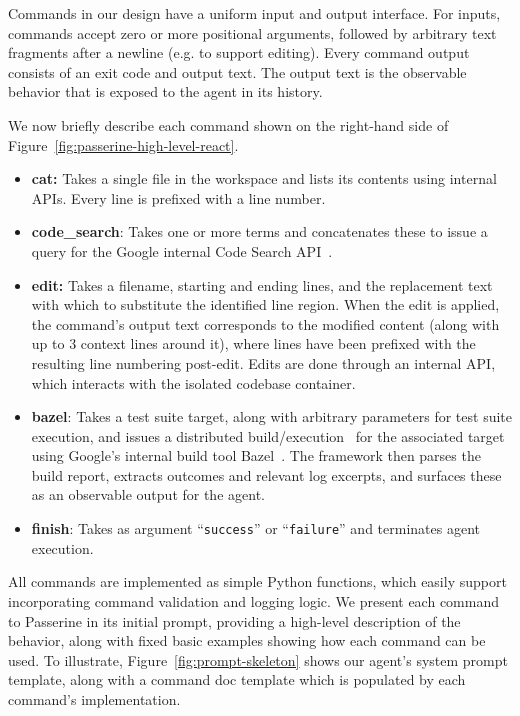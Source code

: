 Commands in our design have a uniform input and output interface. For inputs, commands accept zero or more positional arguments, followed by arbitrary text fragments after a newline (e.g. to support editing). Every command output consists of an exit code and output text. The output text is the observable behavior that is exposed to the agent in its history.


We now briefly describe each command shown on the right-hand side of Figure~\ref{fig:passerine-high-level-react}.

\begin{itemize}
    \item \textbf{cat:} Takes a single file in the workspace and lists its contents using internal APIs. Every line is prefixed with a line number.
    
    \item \textbf{code\_search}: Takes one or more terms and concatenates these to issue a query for the Google internal Code Search API~\cite{sadowski2015developers}.
    
    
    \item \textbf{edit:} Takes a filename, starting and ending lines, and the replacement text with which to substitute the identified line region. When the edit is applied, the command's output text corresponds to the modified content (along with up to 3 context lines around it), where lines have been prefixed with the resulting line numbering post-edit. Edits are done through an internal API, which interacts with the isolated codebase container.

    \item \textbf{bazel}: Takes a test suite target, along with arbitrary parameters for test suite execution, and issues a distributed build/execution~\cite{greenberg2016building} for the associated target  using Google's internal build tool Bazel~\cite{wang2021smart}. The framework then parses the build report, extracts outcomes and relevant log excerpts, and surfaces these as an observable output for the agent.
    
    
    \item \textbf{finish}: Takes as argument 
    ``\lstinline|success|'' or ``\lstinline|failure|''
    and terminates agent execution.

\end{itemize}

All commands are implemented as simple Python functions, which easily support incorporating command validation and logging logic. We present each command to Passerine in its
initial prompt, providing a high-level description of the behavior, along with
fixed basic examples showing how each command can be used. To illustrate, Figure~\ref{fig:prompt-skeleton} shows our agent's system prompt template, along with a command doc template which is populated by each command's implementation.



